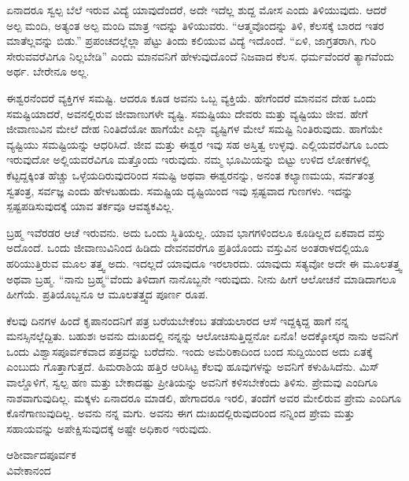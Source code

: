 \newpage

ಏನಾದರೂ ಸ್ವಲ್ಪ ಬೆಲೆ ಇರುವ ವಿದ್ಯೆ ಯಾವುದೆಂದರೆ, ಅದೇ ಇದೆಲ್ಲ ಶುದ್ದ ಮೋಸ ಎಂದು ತಿಳಿಯುವುದು. ಆದರೆ ಅಲ್ಪ ಮಂದಿ, ಅತ್ಯಂತ ಅಲ್ಪ ಮಂದಿ ಮಾತ್ರ ಇದನ್ನು ತಿಳಿಯುವರು. “ಆತ್ಮವೊಂದನ್ನು ತಿಳಿ, ಕೆಲಸಕ್ಕೆ ಬಾರದ ಇತರ ಮಾತೆಲ್ಲವನ್ನು ಬಿಡು.” ಪ್ರಪಂಚದಲ್ಲೆಲ್ಲಾ ಪೆಟ್ಟು ತಿಂದು ಕಲಿಯುವ ವಿದ್ಯೆ ಇದೊಂದೆ. “ಏಳಿ, ಜಾಗ್ರತರಾಗಿ, ಗುರಿ ಸೇರುವವರೆವಿಗೂ ನಿಲ್ಲಬೇಡಿ” ಎಂದು ಮಾನವನಿಗೆ ಹೇಳುವುದೊಂದೆ ನಿಜವಾದ ಕೆಲಸ. ಧರ್ಮವೆಂದರೆ ತ್ಯಾಗವೆಂದು ಅರ್ಥ. ಬೇರೇನೂ ಅಲ್ಲ.
\vspace{0.2cm}

ಈಶ್ವರನೆಂದರೆ ವ್ಯಕ್ತಿಗಳ ಸಮಷ್ಟಿ. ಆದರೂ ಕೂಡ ಅವನು ಒಬ್ಬ ವ್ಯಕ್ತಿಯೆ. ಹೇಗೆಂದರೆ ಮಾನವನ ದೇಹ ಒಂದು ಸಮಷ್ಟಿಯಾದರೆ, ಅವನಲ್ಲಿರುವ ಜೀವಾಣುಗಳೇ  ವ್ಯಷ್ಟಿ. ಸಮಷ್ಟಿಯು ದೇವರು ಮತ್ತು ವ್ಯಷ್ಟಿಯು ಜೀವ. ಹೇಗೆ ಜೀವಾಣುವಿನ  ಮೇಲೆ ದೇಹ ನಿಂತಿದೆಯೋ ಹಾಗೆಯೇ ಎಲ್ಲಾ ವ್ಯಷ್ಟಿಗಳ ಮೇಲೆ ಸಮಷ್ಟಿ ನಿಂತಿರುವುದು. ಹಾಗೆಯೇ ವ್ಯಷ್ಟಿಯು ಸಮಷ್ಟಿಯನ್ನು ಆಧರಿಸಿದೆ. ಜೀವ ಮತ್ತು ಈಶ್ವರ ಇವು ಸಹ ಅಸ್ತಿತ್ವ ಉಳ್ಳವು. ಎಲ್ಲಿಯವರೆವಿಗೂ ಒಂದು ಇರುವುದೋ ಅಲ್ಲಿಯವರೆವಿಗೂ ಮತ್ತೊಂದು ಇರುವುದು. ನಮ್ಮ ಭೂಮಿಯನ್ನು ಬಿಟ್ಟು ಉಳಿದ ಲೋಕಗಳಲ್ಲಿ ಕೆಟ್ಟದ್ದಕ್ಕಿಂತ ಹೆಚ್ಚು ಒಳ್ಳೆಯದಿರುವುದರಿಂದ ಸಮಷ್ಟಿ ಅಥವಾ ಈಶ್ವರನನ್ನು, ಅನಂತ ಕಲ್ಯಾಣಮಯ, ಸರ್ವತಂತ್ರ ಸ್ವತಂತ್ರ, ಸರ್ವಜ್ಞ ಎಂದು ಹೇಳಬಹುದು. ಸಮಷ್ಟಿಯ ದೃಷ್ಟಿಯಿಂದ ಇವು ಸ್ಪಷ್ಟವಾದ ಗುಣಗಳು. ಇದನ್ನು ಸ್ಪಷ್ಟಪಡಿಸುವುದಕ್ಕೆ ಯಾವ ತರ್ಕವೂ ಆವಶ್ಯಕವಿಲ್ಲ.
\vspace{0.2cm}

ಬ್ರಹ್ಮ ಇವೆರಡರ ಆಚೆ ಇರುವನು. ಅದು ಒಂದು ಸ್ಥಿತಿಯಲ್ಲ. ಯಾವ ಭಾಗಗಳಿಂದಲೂ ಕೂಡಿಲ್ಲದ ಏಕವಾದ ವಸ್ತು ಅದೊಂದೆ. ಒಂದು ಜೀವಾಣುವಿನಿಂದ ಹಿಡಿದು ದೇವನವರೆಗೂ ಪ್ರತಿಯೊಂದು ವಸ್ತುವಿನ ಅಂತರಾಳದಲ್ಲಿಯೂ ಹರಿಯುತ್ತಿರುವ ಮೂಲ ತತ್ತ್ವ ಅದು. ಇದಲ್ಲದೆ ಯಾವುದೂ ಇರಲಾರದು. ಯಾವುದು ಸತ್ಯವೋ ಅದೇ ಈ ಮೂಲತತ್ತ್ವ ಅಥವಾ ಬ್ರಹ್ಮ. “ನಾನು ಬ್ರಹ್ಮ“ವೆಂದು ತಿಳಿದಾಗ ನಾನೊಬ್ಬನೇ ಇರುವುದು. ನೀನು ಹೀಗೆ ಆಲೋಚನೆ ಮಾಡಿದಾಗಲೂ ಹೀಗೆಯೆ. ಪ್ರತಿಯೊಬ್ಬನೂ ಆ ಮೂಲತತ್ತ್ವದ ಪೂರ್ಣ ರೂಪ.
\vspace{0.2cm}

ಕೆಲವು ದಿನಗಳ ಹಿಂದೆ ಕೃಪಾನಂದನಿಗೆ ಪತ್ರ ಬರೆಯಬೇಕೆಂಬ ತಡೆಯಲಾರದ ಆಸೆ ಇದ್ದಕ್ಕಿದ್ದ ಹಾಗೆ ನನ್ನ ಮನಸ್ಸಿನಲ್ಲೆದ್ದಿತು. ಬಹುಶಃ ಅವನು ದುಃಖದಲ್ಲಿ ನನ್ನನ್ನು ಆಲೋಚಿಸುತ್ತಿದ್ದನೋ ಏನೊ! ಅದಕ್ಕೋಸ್ಕರ ನಾನು ಅವನಿಗೆ ಒಂದು ವಿಶ್ವಾಸಪೂರ್ವಕವಾದ ಪತ್ರವನ್ನು ಬರೆದೆನು. ಇಂದು ಅಮೆರಿಕಾದಿಂದ ಬಂದ ಸುದ್ದಿಯಿಂದ ಅದು ಏತಕ್ಕೆ ಎಂಬುದು ಗೊತ್ತಾಗುತ್ತದೆ. ಹಿಮರಾಶಿಯ ಹತ್ತಿರ ಆರಿಸಿಟ್ಟ ಕೆಲವು ಹೂವುಗಳನ್ನು ಅವನಿಗೆ ಕಳುಹಿಸಿದೆನು. ಮಿಸ್ ವಾಲ್ಡೊಳಿಗೆ, ಸ್ವಲ್ಪ ಹಣ ಮತ್ತು ಬೇಕಾದಷ್ಟು ಪ್ರೀತಿಯನ್ನು ಅವನಿಗೆ ಕಳಿಸಬೇಕೆಂದು ತಿಳಿಸು. ಪ್ರೇಮವು ಎಂದಿಗೂ ನಾಶವಾಗುವುದಿಲ್ಲ. ಮಕ್ಕಳು ಏನಾದರೂ ಮಾಡಲಿ, ಹೇಗಾದರೂ ಇರಲಿ, ತಂದೆಗೆ ಅವರ ಮೇಲಿರುವ ಪ್ರೇಮ ಎಂದಿಗೂ ಕೊನೆಗಾಣುವುದಿಲ್ಲ. ಅವನು ನನ್ನ ಮಗು. ಅವನು ಈಗ ದುಃಖದಲ್ಲಿರುವುದರಿಂದ ನನ್ನಿಂದ ಪ್ರೇಮ ಮತ್ತು ಸಹಾಯವನ್ನು ಅಪೇಕ್ಷಿಸುವುದಕ್ಕೆ ಅಷ್ಟೇ ಅಧಿಕಾರ ಇರುವುದು.

{\flushright
ಆಶೀರ್ವಾದಪೂರ್ವಕ\\ವಿವೇಕಾನಂದ\par}

